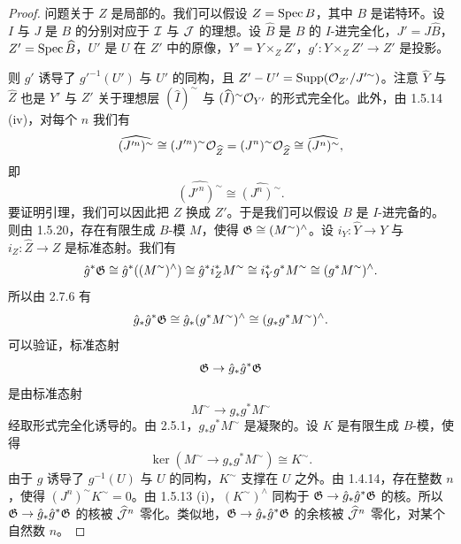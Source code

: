 \begin{proof}
问题关于 $Z$ 是局部的。我们可以假设 $Z=\operatorname{Spec} B$，其中 $B$ 是诺特环。设 $I$ 与 $J$ 是 $B$ 的分别对应于 $\mathcal{I}$ 与 $\mathcal{J}$ 的理想。设 $\widehat{B}$ 是 $B$ 的 $I$-进完全化，$J'=J\widehat{B}$，$Z'=\operatorname{Spec}\widehat{B}$，$U'$ 是 $U$ 在 $Z'$ 中的原像，$Y'=Y\times_Z Z'$，$g'\colon Y\times_Z Z'\to Z'$ 是投影。
\begin{center}
\end{center}
则 $g'$ 诱导了 $g'^{-1}(U')$ 与 $U'$ 的同构，且 $Z'-U'=\operatorname{Supp}(\mathcal{O}_{Z'}/J'^{\sim})$。注意 $\widehat{Y}$ 与 $\widehat{Z}$ 也是 $Y'$ 与 $Z'$ 关于理想层 $(\widehat{I})^{\sim}$ 与 $(\widehat{I})^{\sim}\mathcal{O}_{Y'}$ 的形式完全化。此外，由 1.5.14 (iv)，对每个 $n$ 我们有
\begin{equation*}
\widehat{(J'^n)^{\sim}}\cong(J'^n)^{\sim}\mathcal{O}_{\widehat{Z}}=(J^n)^{\sim}\mathcal{O}_{\widehat{Z}}\cong\widehat{(J^n)^{\sim}},
\end{equation*}
即
\begin{equation*}
\widehat{(J'^n)^{\sim}}\cong\widehat{(J^n)^{\sim}}.
\end{equation*}
要证明引理，我们可以因此把 $Z$ 换成 $Z'$。于是我们可以假设 $B$ 是 $I$-进完备的。则由 1.5.20，存在有限生成 $B$-模 $M$，使得 $\mathfrak{G}\cong(M^{\sim})^{\wedge}$。设 $i_Y\colon\widehat{Y}\to Y$ 与 $i_Z\colon\widehat{Z}\to Z$ 是标准态射。我们有
\begin{equation*}
\hat{g}^*\mathfrak{G}\cong\hat{g}^*((M^{\sim})^{\wedge})\cong\hat{g}^*i_Z^*M^{\sim}\cong i_Y^*g^*M^{\sim}\cong(g^*M^{\sim})^{\wedge}.
\end{equation*}
所以由 2.7.6 有
\begin{equation*}
\hat{g}_*\hat{g}^*\mathfrak{G}\cong\hat{g}_*(g^*M^{\sim})^{\wedge}\cong(g_*g^*M^{\sim})^{\wedge}.
\end{equation*}
可以验证，标准态射
\begin{equation*}
\mathfrak{G}\to\hat{g}_*\hat{g}^*\mathfrak{G}
\end{equation*}
是由标准态射
\begin{equation*}
M^{\sim}\to g_*g^*M^{\sim}
\end{equation*}
经取形式完全化诱导的。由 2.5.1，$g_*g^*M^{\sim}$ 是凝聚的。设 $K$ 是有限生成 $B$-模，使得
\begin{equation*}
\ker(M^{\sim}\to g_*g^*M^{\sim})\cong K^{\sim}.
\end{equation*}
由于 $g$ 诱导了 $g^{-1}(U)$ 与 $U$ 的同构，$K^{\sim}$ 支撑在 $U$ 之外。由 1.4.14，存在整数 $n$，使得 $(J^n)^{\sim}K^{\sim}=0$。由 1.5.13 (i)，$(K^{\sim})^{\wedge}$ 同构于 $\mathfrak{G}\to\hat{g}_*\hat{g}^*\mathfrak{G}$ 的核。所以 $\mathfrak{G}\to\hat{g}_*\hat{g}^*\mathfrak{G}$ 的核被 $\widehat{\mathcal{J}}^n$ 零化。类似地，$\mathfrak{G}\to\hat{g}_*\hat{g}^*\mathfrak{G}$ 的余核被 $\widehat{\mathcal{J}}^n$ 零化，对某个自然数 $n$。
\end{proof}

